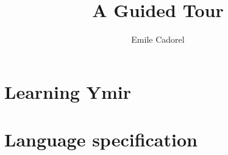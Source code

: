 \documentclass[twoside,a4paper,11pt]{book}
\author{Emile Cadorel}
\title{A Guided Tour}
\begin{document}
\setlength{\aweboxleftmargin}{0.08\linewidth}
\setlength{\aweboxcontentwidth}{0.84\linewidth}


\ymirtitlepage

\dominitoc
\dominilof
\dominilot



\cleardoublepage
\begingroup
\hypersetup{linkcolor=black}
\tableofcontents
\endgroup

\nopagecolor{}
\part{Learning Ymir}



\pagecolor{gray!10!white}
\part{Language specification}
\end{document}
